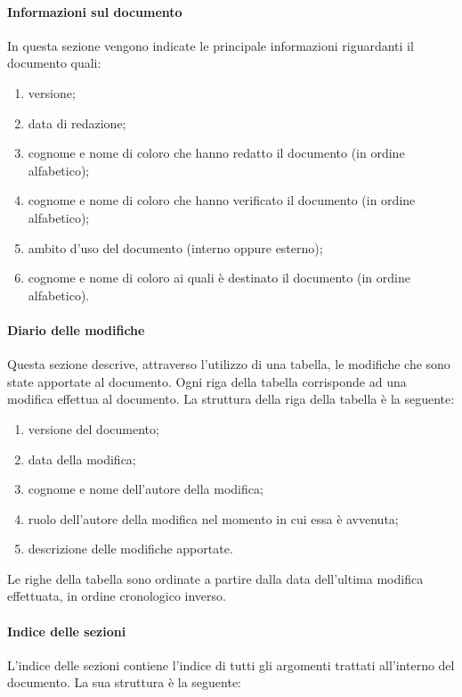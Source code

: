 \documentclass[../NormeProgetto.tex]{subfiles}
\begin{document}
		\paragraph{Informazioni sul documento}
			In questa sezione vengono indicate le principale informazioni riguardanti il documento quali:
			\begin{enumerate}
				\item versione;
				\item data di redazione;
				\item cognome e nome di coloro che hanno redatto il documento (in ordine alfabetico);
				\item cognome e nome di coloro che hanno verificato il documento (in ordine alfabetico);
				\item ambito d'uso del documento (interno oppure esterno);
				\item cognome e nome di coloro ai quali è destinato il documento (in ordine alfabetico).
			\end{enumerate}

		\paragraph{Diario delle modifiche}
			Questa sezione descrive, attraverso l'utilizzo di una tabella, le modifiche che sono state apportate al documento. Ogni riga della tabella corrisponde ad una modifica effettua al documento. La struttura della riga della tabella è la seguente:
			\begin{enumerate}
				\item versione del documento;
				\item data della modifica;
				\item cognome e nome dell'autore della modifica;
				\item ruolo dell'autore della modifica nel momento in cui essa è avvenuta;
				\item descrizione delle modifiche apportate.
			\end{enumerate}

			Le righe della tabella sono ordinate a partire dalla data dell'ultima modifica effettuata, in ordine cronologico inverso.

		\paragraph{Indice delle sezioni}
			L'indice delle sezioni contiene l'indice di tutti gli argomenti trattati all'interno del documento. La sua struttura è la seguente:
\end{document}
